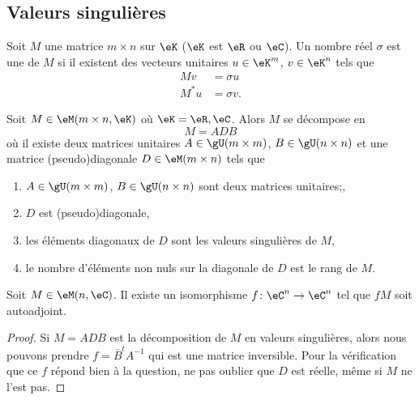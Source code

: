 \subsection{Valeurs singulières}

\begin{definition}
    Soit \( M\) une matrice \( m\times n\) sur \( \eK\) (\( \eK\) est \( \eR\) ou \( \eC\)). Un nombre réel \( \sigma\) est une  de \( M\) si il existent des vecteurs unitaires \( u\in \eK^m\), \( v\in \eK^n\) tels que
    \begin{subequations}
        \begin{align}
            Mv&=\sigma u\\
            M^*u&=\sigma v.
        \end{align}
    \end{subequations}
\end{definition}

\begin{theorem}
    Soit \( M\in \eM(m\times n,\eK)\) où \( \eK=\eR,\eC\). Alors \( M\) se décompose en
    \begin{equation}
        M=ADB
    \end{equation}
    où
    il existe deux matrices unitaires \( A\in \gU(m\times m)\), \( B\in \gU(n\times n)\) et une matrice (pseudo)diagonale \( D\in \eM(m\times n)\) tels que
    \begin{enumerate}
        \item 
            \( A\in\gU(m\times m)\), \( B\in\gU(n\times n)\) sont deux matrices unitaires;,
        \item
            \( D\) est (pseudo)diagonale,
        \item
            les éléments diagonaux de \( D\) sont les valeurs singulières de \( M\),
        \item
            le nombre d'éléments non nuls sur la diagonale de \( D\) est le rang de \( M\).
    \end{enumerate}
\end{theorem}

\begin{corollary}
    Soit \( M\in \eM(n,\eC)\). Il existe un isomorphisme \( f\colon \eC^n\to \eC^n\) tel que \( fM\) soit autoadjoint.
\end{corollary}

\begin{proof}
    Si \( M=ADB\) est la décomposition de \( M\) en valeurs singulières, alors nous pouvons prendre \( f=\overline{ B }^tA^{-1}\) qui est une matrice inversible. Pour la vérification que ce \( f\) répond bien à la question, ne pas oublier que \( D\) est réelle, même si \( M\) ne l'est pas.
\end{proof}
